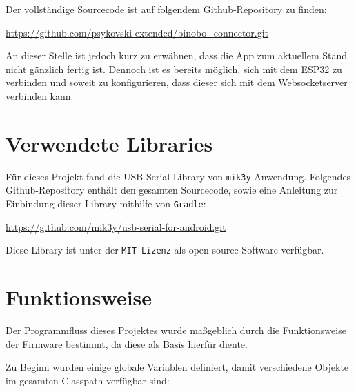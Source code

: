 \documentclass[paper=a4,12pt]{scrreprt}
\begin{document}
Der vollständige Sourcecode ist auf folgendem Github-Repository zu finden:\newline

\url{https://github.com/psykovski-extended/binobo_connector.git}\newline

An dieser Stelle ist jedoch kurz zu erwähnen, dass die App zum aktuellem Stand nicht gänzlich fertig ist.\newline
Dennoch ist es bereits möglich, sich mit dem ESP32 zu verbinden und soweit zu konfigurieren, dass dieser sich mit dem Websocketserver verbinden kann.\newline


\section{Verwendete Libraries}

Für dieses Projekt fand die USB-Serial Library von \texttt{mik3y} Anwendung. Folgendes Github-Repository enthält den gesamten Sourcecode, sowie eine Anleitung zur Einbindung dieser Library mithilfe von \texttt{Gradle}:\newline

\url{https://github.com/mik3y/usb-serial-for-android.git}\newline

Diese Library ist unter der \texttt{MIT-Lizenz} als open-source Software verfügbar.\newline

\section{Funktionsweise}

Der Programmfluss dieses Projektes wurde maßgeblich durch die Funktionsweise der Firmware bestimmt, da diese als Basis hierfür diente.\newline

Zu Beginn wurden einige globale Variablen definiert, damit verschiedene Objekte im gesamten Classpath verfügbar sind:\newline
\end{document}
